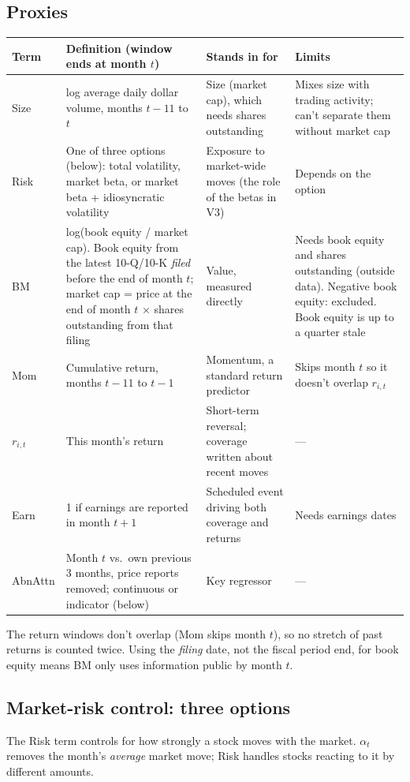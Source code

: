\documentclass[11pt]{article}
\begin{document}
\subsection*{Proxies}
\begin{center}\small
\begin{tabularx}{\textwidth}{>{\raggedright}p{1.6cm} >{\raggedright}p{4.3cm} >{\raggedright}p{3.3cm} >{\raggedright\arraybackslash}X}
\toprule
Term & Definition (window ends at month $t$) & Stands in for & Limits\\
\midrule
Size & log average daily dollar volume, months $t{-}11$ to $t$ & Size (market cap), which needs shares outstanding & Mixes size with trading activity; can't separate them without market cap\\
Risk & One of three options (below): total volatility, market beta, or market beta + idiosyncratic volatility & Exposure to market-wide moves (the role of the betas in V3) & Depends on the option\\
BM & log(book equity / market cap). Book equity from the latest 10-Q/10-K \emph{filed} before the end of month $t$; market cap = price at the end of month $t$ $\times$ shares outstanding from that filing & Value, measured directly & Needs book equity and shares outstanding (outside data). Negative book equity: excluded. Book equity is up to a quarter stale\\
Mom & Cumulative return, months $t{-}11$ to $t{-}1$ & Momentum, a standard return predictor & Skips month $t$ so it doesn't overlap $r_{i,t}$\\
$r_{i,t}$ & This month's return & Short-term reversal; coverage written about recent moves & ---\\
Earn & 1 if earnings are reported in month $t{+}1$ & Scheduled event driving both coverage and returns & Needs earnings dates\\
AbnAttn & Month $t$ vs.\ own previous 3 months, price reports removed; continuous or indicator (below) & Key regressor & ---\\
\bottomrule
\end{tabularx}
\end{center}
The return windows don't overlap (Mom skips month $t$), so no stretch of past returns is counted twice. Using the \emph{filing} date, not the fiscal period end, for book equity means BM only uses information public by month $t$.

\subsection*{Market-risk control: three options}
The Risk term controls for how strongly a stock moves with the market. $\alpha_t$ removes the month's \emph{average} market move; Risk handles stocks reacting to it by different amounts.
\end{document}

